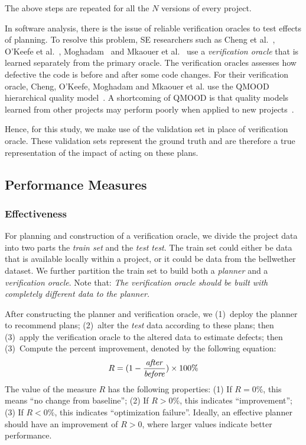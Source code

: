 \documentclass[sigconf, proceedings, 9pt]{acmart}
\begin{document}
The above steps are repeated for all the $N$ versions of every project. 

In software analysis, there is the issue of reliable verification oracles to 
test effects of planning. To resolve this problem, SE researchers such as
Cheng et al.~\cite{Cheng10}, O'Keefe et al.~\cite{OKeeffe08,OKeeffe07},
Moghadam~\cite{Moghadam2011} and Mkaouer et al.~\cite{Mkaouer14}
use a {\em verification oracle} that is learned separately
from the primary oracle. The verification oracles assesses
how defective the code is before and after some
code changes.
For their verification oracle,
Cheng, O'Keefe, Moghadam and  Mkaouer et al. use the QMOOD hierarchical
quality model~\cite{Bansiya02}.
A shortcoming of QMOOD
is that quality models learned from other projects
may perform poorly when applied to new projects~\cite{localvsglobal}.

Hence, for this study, we make use of the validation set in place of 
verification oracle. These validation sets represent the ground truth and are 
therefore a true representation of the impact of acting on these plans.

\subsection{Performance Measures}
\label{sect:evaluation}

\subsubsection{Effectiveness}
\label{sect:effectiveness}
For planning and construction of a verification oracle, we divide the
project data into two parts the \textit{train set} and the \textit{test test}.
The train set could either be data that is available locally within a project, 
or it could be data from the bellwether dataset. We further partition the train 
set to build both a {\em planner} and a {\em verification oracle}. Note that: 
{\em The verification oracle should be built with completely different data to 
the planner.}

After constructing the planner and verification oracle, we (1)~deploy the 
{planner} to recommend plans; (2)~alter the {\em test} data according to these 
plans;
then (3)~apply the {verification oracle} to the altered data to estimate 
defects; then (3)~Compute the percent improvement, denoted by the following 
equation:
\begin{equation}
\small
\label{eq:effectiveness}
R=(1-\frac{\mathit{after}}{\mathit{before}})\times100\%
\end{equation}
The value of the measure $R$ has the following properties: (1) If $R = 0\%$, 
this means  ``no change from baseline''; 
(2) If $R > 0\%$, this indicates ``improvement'';
(3) If $R < 0\%$, this indicates ``optimization failure''. Ideally, an 
effective planner should have an improvement of $R>0$, where larger values 
indicate better performance. 
\end{document}
